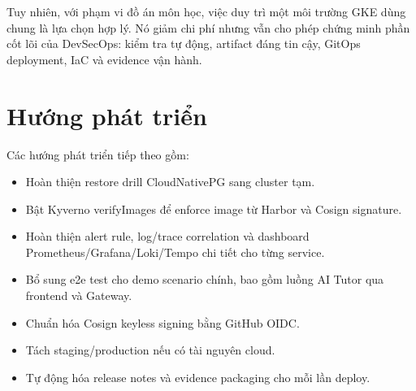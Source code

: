 Tuy nhiên, với phạm vi đồ án môn học, việc duy trì một môi trường GKE dùng chung là lựa chọn hợp lý. Nó giảm chi phí nhưng vẫn cho phép chứng minh phần cốt lõi của DevSecOps: kiểm tra tự động, artifact đáng tin cậy, GitOps deployment, IaC và evidence vận hành.

\section{Hướng phát triển}

Các hướng phát triển tiếp theo gồm:

\begin{itemize}
  \item Hoàn thiện restore drill CloudNativePG sang cluster tạm.
  \item Bật Kyverno verifyImages để enforce image từ Harbor và Cosign signature.
  \item Hoàn thiện alert rule, log/trace correlation và dashboard Prometheus/Grafana/Loki/Tempo chi tiết cho từng service.
  \item Bổ sung e2e test cho demo scenario chính, bao gồm luồng AI Tutor qua frontend và Gateway.
  \item Chuẩn hóa Cosign keyless signing bằng GitHub OIDC.
  \item Tách staging/production nếu có tài nguyên cloud.
  \item Tự động hóa release notes và evidence packaging cho mỗi lần deploy.
\end{itemize}
